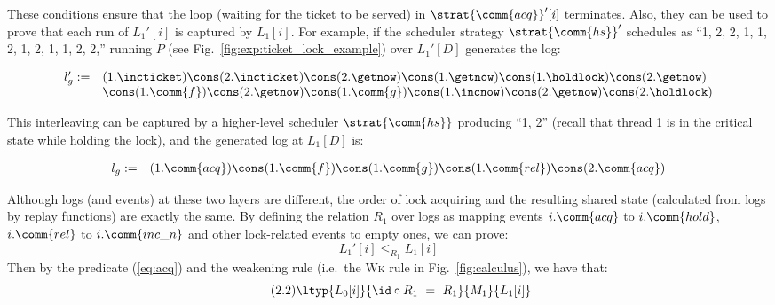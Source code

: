 \noindent These conditions ensure that the loop (waiting for the ticket 
to be served) in $\strat{\comm{acq}}'[i]$  terminates. Also, they can be used to prove that each run of $L_1'[i]$ is captured by $L_1[i]$. For example, if the scheduler strategy  $\strat{\comm{hs}}'$ schedules as  ``1, 2, 2, 1, 1, 2, 1, 2, 1, 1, 2, 2,'' running $P$ (see Fig.~\ref{fig:exp:ticket_lock_example}) over $L_1'[D]$ generates the log:%

\begin{small}
\[
\begin{array}{rl}
l'_{g} := &
 (1.\incticket) \cons
(2.\incticket) \cons
(2.\getnow) \cons
(1.\getnow)  \cons 
 (1.\holdlock) \cons 
(2.\getnow) \\
&
\cons (1.\comm{f})
\cons (2.\getnow)
\cons (1.\comm{g})
\cons (1.\incnow) 
\cons (2.\getnow)
\cons (2.\holdlock) 
\end{array}
\]
\end{small}

\noindent This interleaving can be captured by a higher-level scheduler $\strat{\comm{hs}}$ producing ``1, 2'' (recall that thread 1 is in the critical state while holding the lock),
and the generated log at $L_1[D]$ is:%
\begin{small}
\[
\begin{array}{rl}
l_{g} := &
 (1.\comm{acq})
\cons (1.\comm{f})
\cons (1.\comm{g})
\cons (1.\comm{rel})
\cons 
 (2.\comm{acq}) 
\end{array}
\]
\end{small}%
Although logs (and events) at these two layers are different, the order of lock acquiring and 
the resulting shared state (calculated from logs by replay functions) are exactly the same. By defining the relation $R_1$ over logs as mapping events $i.\comm{acq}$ to $i.\comm{hold}$, $i.\comm{rel}$  to $i.\comm{inc\_n}$ and other lock-related events to empty ones, we can prove:%
$$L_1'[i] \le_{R_1} L_1[i]$$
Then by the predicate (\ref{eq:acq}) and the weakening rule (i.e.\, the \textsc{Wk} rule in Fig.~\ref{fig:calculus}), we have that:%
\begin{equation}\label{eq:acq:h} \tag{2.2}
\ltyp{L_0[i]}{\id \circ R_1\ =\ R_1}{M_1}{L_1[i]}
\end{equation}

